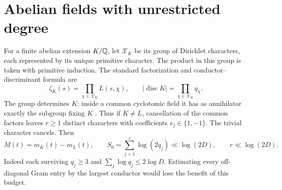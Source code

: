 \documentclass[11pt]{article}
\begin{document}
\section{Abelian fields with unrestricted degree}
For a finite abelian extension $K/\mathbb Q$, let $\mathcal X_K$ be its group of
Dirichlet characters, each represented by its unique primitive character.
The product in this group is taken with primitive induction. The standard
factorization and conductor--discriminant formula are
\begin{equation}\label{eq:class}
 \zeta_K(s)=\prod_{\chi\in\mathcal X_K} L(s,\chi),
 \qquad |\operatorname{disc}K|=\prod_{\chi\in\mathcal X_K} q_\chi .
\end{equation}
The group determines $K$: inside a common cyclotomic field it has as
annihilator exactly the subgroup fixing $K$ \cite[Chs.~3--4]{wash}.
Thus if $K\ne L$, cancellation of the common factors leaves $r\ge1$
distinct characters with coefficients $v_j\in\{1,-1\}$. The trivial
character cancels. Then
\begin{equation}\label{eq:budget}
 M(t)=m_K(t)-m_L(t),\qquad
 S_0=\sum_{j=1}^r\log(2q_j)\ll\log(2D),\qquad r\ll\log(2D).
\end{equation}
Indeed each surviving $q_j\ge3$ and $\sum_j\log q_j\le2\log D$.
Estimating every off-diagonal Gram entry by the largest conductor would
lose the benefit of this budget.
\end{document}
